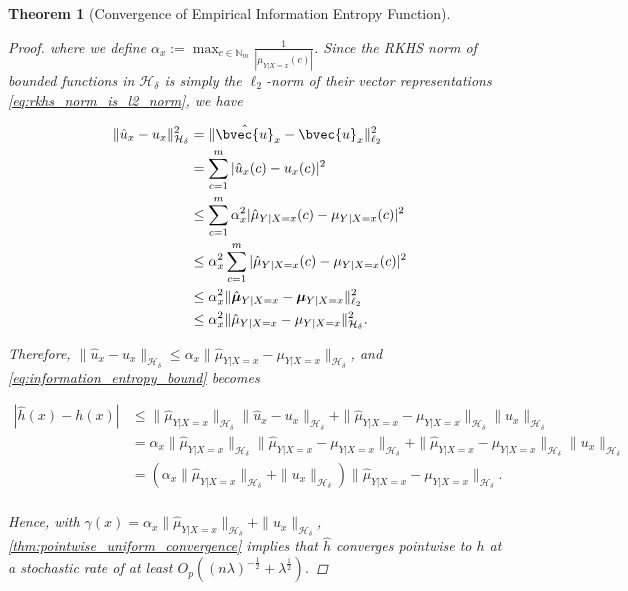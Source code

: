 \documentclass{article}
\newtheorem{theorem}{Theorem}[section]
\begin{document}
\begin{theorem}[Convergence of Empirical Information Entropy Function]
\begin{proof}
				where we define $\alpha_{x} := \max_{c \in \mathbb{N}_{m}} \frac{1}{| \mu_{Y | X = x}(c) |}$. Since the RKHS norm of bounded functions in $\mathcal{H}_{\delta}$ is simply the $\ell_{2}$-norm of their vector representations \eqref{eq:rkhs_norm_is_l2_norm}, we have
				
				\begin{equation}
				\begin{aligned}
					\| \hat{u}_{x} - u_{x} \|_{\mathcal{H}_{\delta}}^{2} &= \| \hat{\bvec{u}}_{x} - \bvec{u}_{x} \|_{\ell_{2}}^{2} \\
					&= \sum_{c = 1}^{m} | \hat{u}_{x}(c) - u_{x}(c) |^{2} \\
					&\leq \sum_{c = 1}^{m} \alpha_{x}^{2} | \hat{\mu}_{Y | X = x}(c) - \mu_{Y | X = x}(c) |^{2} \\
					&\leq \alpha_{x}^{2} \sum_{c = 1}^{m} | \hat{\mu}_{Y | X = x}(c) - \mu_{Y | X = x}(c) |^{2} \\
					&\leq \alpha_{x}^{2} \| \hat{\bm{\mu}}_{Y | X = x} - \bm{\mu}_{Y | X = x}  \|_{\ell_{2}}^{2} \\
					&\leq \alpha_{x}^{2} \| \hat{\mu}_{Y | X = x} - \mu_{Y | X = x} \|_{\mathcal{H}_{\delta}}^{2}. \\
				\end{aligned}
				\end{equation}
				
				Therefore, $\| \hat{u}_{x} - u_{x} \|_{\mathcal{H}_{\delta}} \leq \alpha_{x} \| \hat{\mu}_{Y | X = x} - \mu_{Y | X = x} \|_{\mathcal{H}_{\delta}}$, and \eqref{eq:information_entropy_bound} becomes
				
				\begin{equation}
				\begin{aligned}
					| \hat{h}(x) - h(x) | &\leq \| \hat{\mu}_{Y | X = x} \|_{\mathcal{H}_{\delta}} \| \hat{u}_{x} - u_{x} \|_{\mathcal{H}_{\delta}} + \| \hat{\mu}_{Y | X = x} - \mu_{Y | X = x} \|_{\mathcal{H}_{\delta}} \| u_{x} \|_{\mathcal{H}_{\delta}} \\
					&= \alpha_{x} \| \hat{\mu}_{Y | X = x} \|_{\mathcal{H}_{\delta}} \| \hat{\mu}_{Y | X = x} - \mu_{Y | X = x} \|_{\mathcal{H}_{\delta}} + \| \hat{\mu}_{Y | X = x} - \mu_{Y | X = x} \|_{\mathcal{H}_{\delta}} \| u_{x} \|_{\mathcal{H}_{\delta}} \\
					&= ( \alpha_{x} \| \hat{\mu}_{Y | X = x} \|_{\mathcal{H}_{\delta}} + \| u_{x} \|_{\mathcal{H}_{\delta}} ) \| \hat{\mu}_{Y | X = x} - \mu_{Y | X = x} \|_{\mathcal{H}_{\delta}}. \\
				\end{aligned}
				\end{equation}
				
				Hence, with $\gamma(x) = \alpha_{x} \| \hat{\mu}_{Y | X = x} \|_{\mathcal{H}_{\delta}} + \| u_{x} \|_{\mathcal{H}_{\delta}}$, \cref{thm:pointwise_uniform_convergence} implies that $\hat{h}$ converges pointwise to $h$ at a stochastic rate of at least $O_{p}((n \lambda)^{-\frac{1}{2}} + \lambda^{\frac{1}{2}})$.
			\end{proof}
		\end{theorem}
	
\end{document}
